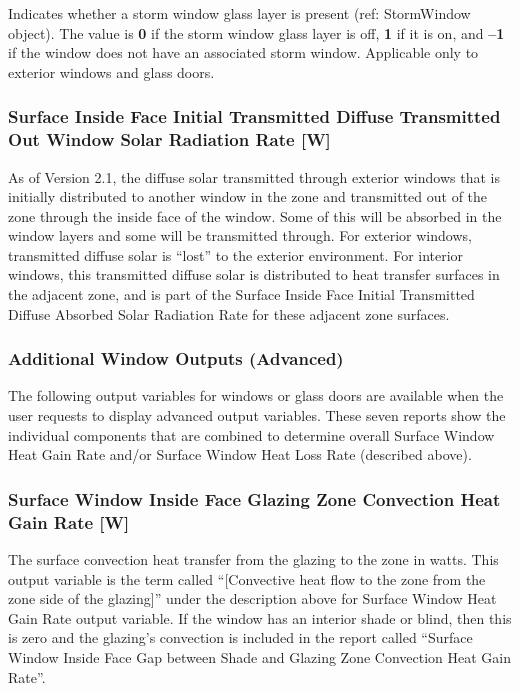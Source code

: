 Indicates whether a storm window glass layer is present (ref: StormWindow object). The value is \textbf{0} if the storm window glass layer is off, \textbf{1} if it is on, and \textbf{--1} if the window does not have an associated storm window. Applicable only to exterior windows and glass doors.

\subsubsection{Surface Inside Face Initial Transmitted Diffuse Transmitted Out Window Solar Radiation Rate {[}W{]}}\label{surface-inside-face-initial-transmitted-diffuse-transmitted-out-window-solar-radiation-rate-w}

As of Version 2.1, the diffuse solar transmitted through exterior windows that is initially distributed to another window in the zone and transmitted out of the zone through the inside face of the window. Some of this will be absorbed in the window layers and some will be transmitted through. For exterior windows, transmitted diffuse solar is ``lost'' to the exterior environment. For interior windows, this transmitted diffuse solar is distributed to heat transfer surfaces in the adjacent zone, and is part of the Surface Inside Face Initial Transmitted Diffuse Absorbed Solar Radiation Rate for these adjacent zone surfaces.

\subsubsection{Additional Window Outputs (Advanced)}\label{additional-window-outputs-advanced}

The following output variables for windows or glass doors are available when the user requests to display advanced output variables. These seven reports show the individual components that are combined to determine overall Surface Window Heat Gain Rate and/or Surface Window Heat Loss Rate (described above).

\subsubsection{Surface Window Inside Face Glazing Zone Convection Heat Gain Rate {[}W{]}}\label{surface-window-inside-face-glazing-zone-convection-heat-gain-rate-w}

The surface convection heat transfer from the glazing to the zone in watts. This output variable is the term called ``{[}Convective heat flow to the zone from the zone side of the glazing{]}'' under the description above for Surface Window Heat Gain Rate output variable. If the window has an interior shade or blind, then this is zero and the glazing's convection is included in the report called ``Surface Window Inside Face Gap between Shade and Glazing Zone Convection Heat Gain Rate''.

